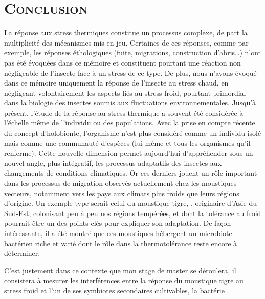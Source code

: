 
\section*{\textsc{Conclusion}}

La réponse aux stress thermiques constitue un processus complexe, de part la multiplicité des mécanismes mis en jeu. 
Certaines de ces réponses, comme par exemple, les réponses éthologiques (fuite, migrations, construction d'abris\ldots)  n'ont pas été évoquées dans ce mémoire et constituent pourtant une réaction non négligeable de l'insecte face à un stress de ce type.
De plus, nous n'avons évoqué dans ce mémoire uniquement la réponse de l'insecte au stress chaud, en négligeant volontairement les aspects liés au stress froid, pourtant primordial dans la biologie des insectes soumis aux fluctuations environnementales.
Jusqu'à présent, l'étude de la réponse au stress thermique a souvent été considérée à l'échelle même de l'individu ou des populations.
Avec la prise en compte récente du concept d'holobionte, l'organisme n'est plus considéré comme un individu isolé mais comme une communauté d'espèces (lui-même et tous les organismes qu'il renferme).
Cette nouvelle dimension permet aujourd'hui d'appréhender sous un nouvel angle, plus intégratif, les processus adaptatifs des insectes aux changements de conditions climatiques.
Or ces derniers jouent un rôle important dans les processus de migration observés actuellement chez les moustiques vecteurs, notamment vers les pays aux climats plus froids que leurs régions d'origine.
Un exemple-type serait celui du moustique tigre, , originaire d'Asie du Sud-Est, colonisant peu à peu nos régions tempérées, et dont la tolérance au froid pourrait être un des points clés pour expliquer son adaptation.
De façon intéressante, il a été montré que ces moustiques hébergent un microbiote bactérien riche et varié dont le rôle dans la thermotolérance reste encore à déterminer.

C'est justement dans ce contexte que mon stage de master se déroulera, il consistera à mesurer les interférences entre la réponse du moustique tigre  au stress froid et l'un de ses symbiotes secondaires cultivables, la bactérie .

